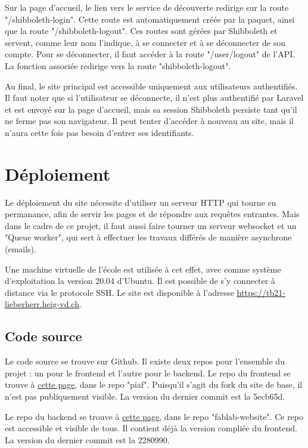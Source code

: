 \documentclass[
    iai, %
    eai, %
]{heig-tb}
\begin{document}
Sur la page d'accueil, le lien vers le service de découverte redirige sur la route "/shibboleth-login". Cette route est automatiquement créée par la paquet, ainsi que la route "/shibboleth-logout". Ces routes sont gérées par Shibboleth et servent, comme leur nom l'indique, à se connecter et à se déconnecter de son compte.
Pour se déconnecter, il faut accéder à la route "/user/logout" de l'API. La fonction associée redirige vers la route "shibboleth-logout".

Au final, le site principal est accessible uniquement aux utilisateurs authentifiés. Il faut noter que si l'utilisateur se déconnecte, il n'est plus authentifié par Laravel et est envoyé sur la page d'accueil, mais sa session Shibboleth persiste tant qu'il ne ferme pas son navigateur. Il peut tenter d'accéder à nouveau au site, mais il n'aura cette fois pas besoin d'entrer ses identifiants.


\newpage
\chapter{Déploiement}
Le déploiement du site nécessite d'utiliser un serveur HTTP qui tourne en permanance, afin de servir les pages et de répondre aux requêtes entrantes. Mais dans le cadre de ce projet, il faut aussi faire tourner un serveur websocket et un "Queue worker", qui sert à effectuer les travaux différés de manière asynchrone (emails).

Une machine virtuelle de l'école est utilisée à cet effet, avec comme système d'exploitation la version 20.04 d'Ubuntu. Il est possible de s'y connecter à distance via le protocole SSH. Le site est disponible à l'adresse \href{https://tb21-lieberherr.heig-vd.ch}{https://tb21-lieberherr.heig-vd.ch}.

\section{Code source}
Le code source se trouve sur Github. Il existe deux repos pour l'ensemble du projet : un pour le frontend et l'autre pour le backend.
Le repo du frontend se trouve à \href{https://github.com/TristanLieberherr/piaf}{cette page}, dans le repo "piaf". Puisqu'il s'agit du fork du site de base, il n'est pas publiquement visible.
La version du dernier commit est la 5ecb65d.

Le repo du backend se trouve à \href{https://github.com/TristanLieberherr/fablab-website}{cette page}, dans le repo "fablab-website". Ce repo est accessible et visible de tous. Il contient déjà la version compliée du frontend. La version du dernier commit est la 2280990.
\end{document}
